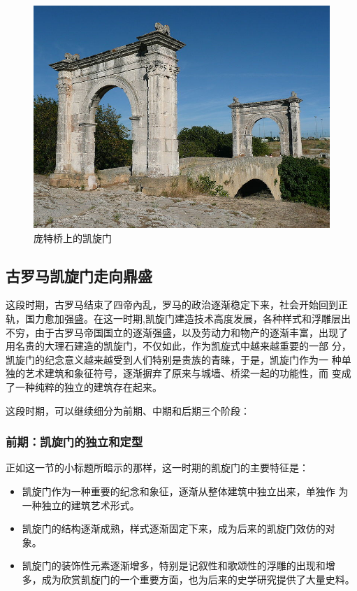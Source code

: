 \documentclass[a4paper,dvipdfm]{article}
\begin{document}
\begin{figure}[hbt!]
  \centering
  \includegraphics[width=\textwidth]{PontFlavien}
  \caption{庞特桥上的凯旋门}
  \label{fig:pont}
\end{figure}

\clearpage

\subsection{古罗马凯旋门走向鼎盛}

这段时期，古罗马结束了四帝內乱，罗马的政治逐渐稳定下来，社会开始回到正
轨，国力愈加强盛。在这一时期,凯旋门建造技术高度发展，各种样式和浮雕层出
不穷，由于古罗马帝国国立的逐渐强盛，以及劳动力和物产的逐渐丰富，出现了
用名贵的大理石建造的凯旋门，不仅如此，作为凯旋式中越来越重要的一部
分，凯旋门的纪念意义越来越受到人们特别是贵族的青睐，于是，凯旋门作为一
种单独的艺术建筑和象征符号，逐渐摒弃了原来与城墙、桥梁一起的功能性，而
变成了一种纯粹的独立的建筑存在起来。

这段时期，可以继续细分为前期、中期和后期三个阶段：

\subsubsection{前期：凯旋门的独立和定型}

正如这一节的小标题所暗示的那样，这一时期的凯旋门的主要特征是：

\begin{itemize}
\item 凯旋门作为一种重要的纪念和象征，逐渐从整体建筑中独立出来，单独作
  为一种独立的建筑艺术形式。
\item 凯旋门的结构逐渐成熟，样式逐渐固定下来，成为后来的凯旋门效仿的对
  象。
\item 凯旋门的装饰性元素逐渐增多，特别是记叙性和歌颂性的浮雕的出现和增
  多，成为欣赏凯旋门的一个重要方面，也为后来的史学研究提供了大量史料。
\end{itemize}
\end{document}
